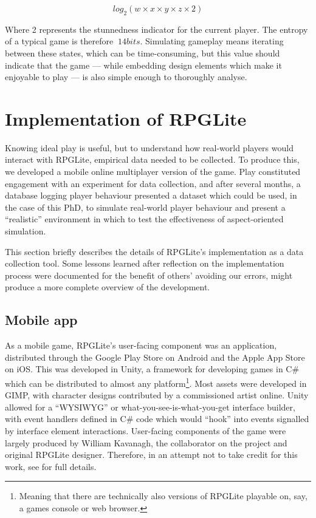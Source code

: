 \[log_2(w\times{}x\times{}y\times{}z\times{}2)\]

Where 2 represents the stunnedness indicator for the current player. The entropy
of a typical game is therefore $~14 bits$. Simulating gameplay means iterating
between these states, which can be time-consuming, but this value should
indicate that the game --- while embedding design elements which make it
enjoyable to play --- is also simple enough to thoroughly analyse.

\section{Implementation of RPGLite}

Knowing ideal play is useful, but to understand how real-world players would
interact with RPGLite, empirical data needed to be collected. To produce this,
we developed a mobile online multiplayer version of the game. Play constituted
engagement with an experiment for data collection, and after several months, a
database logging player behaviour presented a dataset which could be used, in
the case of this PhD, to simulate real-world player behaviour and present a
``realistic'' environment in which to test the effectiveness of aspect-oriented
simulation.

This section briefly describes the details of RPGLite's implementation as a data
collection tool. Some lessons learned after reflection on the implementation
process were documented for the benefit of others' avoiding our
errors\cite{RPGLiteLessonsLearned}, might produce a more complete overview of
the development.

\subsection{Mobile app}

As a mobile game, RPGLite's user-facing component was an application,
distributed through the Google Play Store on Android and the Apple App Store on
iOS. This was developed in Unity, a framework for developing games in C\# which
can be distributed to almost any platform\footnote{Meaning that there are
technically also versions of RPGLite playable on, say, a games console or web
browser.}. Most assets were developed in GIMP, with character designs
contributed by a commissioned artist online. Unity allowed for a ``WYSIWYG''
or what-you-see-is-what-you-get interface builder, with event handlers defined
in C\# code which would ``hook'' into events signalled by interface element
interactions. User-facing components of the game were largely produced by
William Kavanagh, the collaborator on the project and original RPGLite designer.
Therefore, in an attempt not to take credit for this work, see  for full details.

